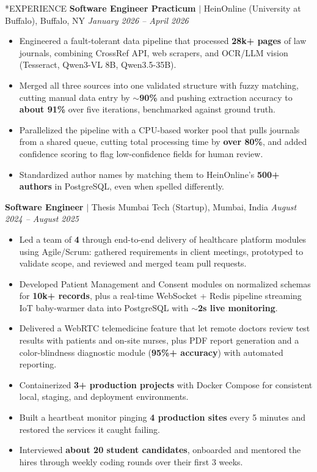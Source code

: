 \documentclass[10pt, letterpaper]{article}
\makeatletter
\newcommand{\rolegap}{\vspace{5.2pt}}
\renewcommand{\section}{\@startsection{section}{1}{\z@}{-0.36em \@plus -0.1ex \@minus -0.1ex}{0.26ex \@plus 0.1ex}{\normalfont\large\bfseries}}
\makeatother
\begin{document}
\section*{EXPERIENCE}
\noindent\textbf{Software Engineer Practicum} $|$ HeinOnline (University at Buffalo), Buffalo, NY \hfill \textit{January 2026 -- April 2026}
\begin{itemize}\setlength{\itemsep}{0.48pt}
\item Engineered a fault-tolerant data pipeline that processed \textbf{28k+ pages} of law journals, combining CrossRef API, web scrapers, and OCR/LLM vision (Tesseract, Qwen3-VL 8B, Qwen3.5-35B).
\item Merged all three sources into one validated structure with fuzzy matching, cutting manual data entry by \textbf{$\sim$90\%} and pushing extraction accuracy to \textbf{about 91\%} over five iterations, benchmarked against ground truth.
\item Parallelized the pipeline with a CPU-based worker pool that pulls journals from a shared queue, cutting total processing time by \textbf{over 80\%}, and added confidence scoring to flag low-confidence fields for human review.
\item Standardized author names by matching them to HeinOnline's \textbf{500+ authors} in PostgreSQL, even when spelled differently.
\end{itemize}
\rolegap
\noindent\textbf{Software Engineer} $|$ Thesis Mumbai Tech (Startup), Mumbai, India \hfill \textit{August 2024 -- August 2025}
\begin{itemize}\setlength{\itemsep}{0.48pt}
\item Led a team of \textbf{4} through end-to-end delivery of healthcare platform modules using Agile/Scrum: gathered requirements in client meetings, prototyped to validate scope, and reviewed and merged team pull requests.
\item Developed Patient Management and Consent modules on normalized schemas for \textbf{10k+ records}, plus a real-time WebSocket + Redis pipeline streaming IoT baby-warmer data into PostgreSQL with \textbf{$\sim$2s live monitoring}.
\item Delivered a WebRTC telemedicine feature that let remote doctors review test results with patients and on-site nurses, plus PDF report generation and a color-blindness diagnostic module (\textbf{95\%+ accuracy}) with automated reporting.
\item Containerized \textbf{3+ production projects} with Docker Compose for consistent local, staging, and deployment environments.
\item Built a heartbeat monitor pinging \textbf{4 production sites} every 5 minutes and restored the services it caught failing.
\item Interviewed \textbf{about 20 student candidates}, onboarded and mentored the hires through weekly coding rounds over their first 3 weeks.
\end{itemize}
\end{document}
